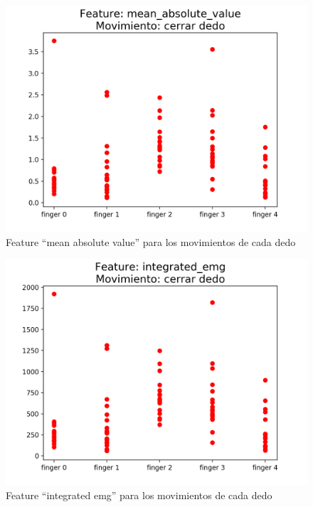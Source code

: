 \documentclass{article}
\begin{document}
\begin{figure}[ht]
    \centering
    \includegraphics[width=\textwidth]{Figure_1.png}%
    \caption{Feature “mean absolute value” para los movimientos de cada dedo}
    \label{fig:feature1}
\end{figure}

\begin{figure}[ht]
    \centering
    \includegraphics[width=\textwidth]{Figure_2.png}%
    \caption{Feature “integrated emg” para los movimientos de cada dedo}
    \label{fig:feature2}
\end{figure}
\end{document}
